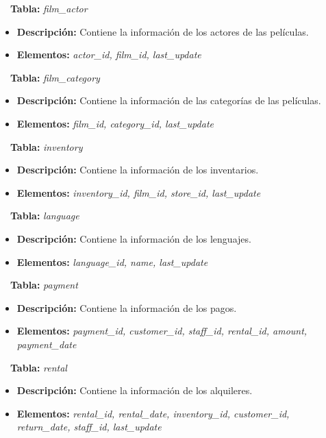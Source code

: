 \documentclass{report}
\begin{document}
\CIRCLE \ \ \textbf{Tabla:} \emph{film\_actor}
\begin{itemize}
  \item \textbf{Descripción:} Contiene la información de los actores de las películas.
  \item \textbf{Elementos:} \emph{actor\_id, film\_id, last\_update}
\end{itemize}

\CIRCLE \ \ \textbf{Tabla:} \emph{film\_category}
\begin{itemize}
  \item \textbf{Descripción:} Contiene la información de las categorías de las películas.
  \item \textbf{Elementos:} \emph{film\_id, category\_id, last\_update}
\end{itemize}

\cleardoublepage

\CIRCLE \ \ \textbf{Tabla:} \emph{inventory}
\begin{itemize}
  \item \textbf{Descripción:} Contiene la información de los inventarios.
  \item \textbf{Elementos:} \emph{inventory\_id, film\_id, store\_id, last\_update}
\end{itemize}


\CIRCLE \ \ \textbf{Tabla:} \emph{language}
\begin{itemize}
  \item \textbf{Descripción:} Contiene la información de los lenguajes.
  \item \textbf{Elementos:} \emph{language\_id, name, last\_update}
\end{itemize}

\CIRCLE \ \ \textbf{Tabla:} \emph{payment}
\begin{itemize}
  \item \textbf{Descripción:} Contiene la información de los pagos.
  \item \textbf{Elementos:} \emph{payment\_id, customer\_id, staff\_id, rental\_id, amount, payment\_date}
\end{itemize}

\CIRCLE \ \ \textbf{Tabla:} \emph{rental}
\begin{itemize}
  \item \textbf{Descripción:} Contiene la información de los alquileres.
  \item \textbf{Elementos:} \emph{rental\_id, rental\_date, inventory\_id, customer\_id, return\_date, staff\_id, last\_update}
\end{itemize}
\end{document}
